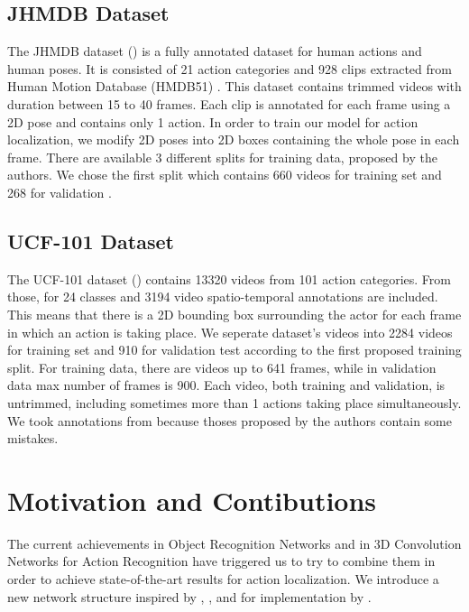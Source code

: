 \subsection{JHMDB Dataset}
The JHMDB dataset (\cite{Jhuang:ICCV:2013}) is a fully annotated dataset for human actions and human poses. It is consisted of 21 action categories and 928
clips extracted from Human Motion Database (HMDB51) \cite{Kuehne11}. This dataset contains trimmed videos with duration between
15 to 40 frames. Each clip is annotated for each frame using a 2D pose and contains only 1 action.
In order to train our model for action localization, we modify 2D poses into 2D boxes containing the whole pose in each frame.
There are available 3 different splits for training data, proposed by the authors. We chose the first split which contains 660
videos for training set and 268 for validation . 

\subsection{UCF-101 Dataset}
The UCF-101 dataset (\cite{soomro2012ucf101}) contains 13320 videos from 101 action categories.
From those, for 24 classes and 3194 video spatio-temporal annotations are included. This means that there is a 2D bounding box surrounding the actor for each frame in which an action is taking place.
We seperate dataset's videos into 2284 videos for training set and 910 for validation test according to the
first proposed training split. For training data, there are videos up to 641 frames, while in validation data max number of frames is 900.
Each video, both training and validation, is untrimmed, including sometimes more than 1 actions taking place simultaneously.
We took annotations from \cite{singh2016online} because thoses  proposed by the authors contain some mistakes.

\section{Motivation and Contibutions}
The current achievements in Object Recognition Networks and in 3D Convolution Networks for Action Recognition have triggered us to try
to combine them in order to achieve state-of-the-art results for action localization. We introduce a new network structure inspired by
\cite{DBLP:journals/corr/HouCS17}, \cite{DBLP:journals/corr/abs-1712-09184},\cite{Ren:2015:FRT:2969239.2969250} and for implementation
by \cite{jjfaster2rcnn}.

